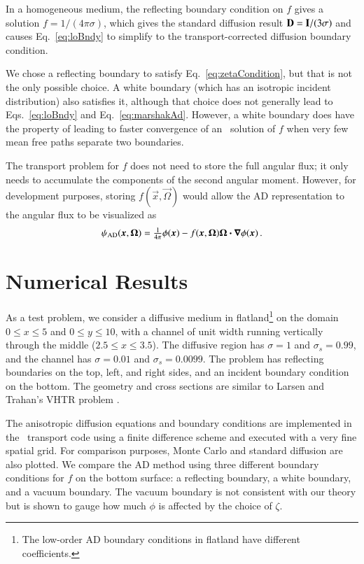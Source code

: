 \documentclass{anstrans}
\begin{document}
In a homogeneous medium, the reflecting boundary condition on $f$ gives a
solution
$f=1/(4\pi\sigma)$, which gives the standard diffusion result $\mathbf{D}=
\mathbf{I}/(3\sigma)$ and causes Eq.~\eqref{eq:loBndy} to simplify to
the transport-corrected diffusion boundary condition.

We chose a reflecting boundary to satisfy Eq.~\eqref{eq:zetaCondition}, but that
is not the only possible choice. A white boundary (which has an isotropic
incident
distribution) also satisfies it,
although that choice does not generally lead to Eqs.~\eqref{eq:loBndy} and
Eq.~\eqref{eq:marshakAd}. However, a white boundary does have the property of
leading to faster convergence of an \SN\ solution of $f$ when very few mean free
paths separate two boundaries.

The transport problem for $f$ does not need to store the full angular flux; it
only needs to accumulate the components of the second angular moment. However,
for development purposes, storing $f(\vec{x},\vec{\Omega})$ would allow the AD
representation to the angular flux to be visualized as
\begin{equation*}
  \psi_\text{AD}(\bm{x},\bm{\Omega}) = \tfrac{1}{4\pi} \phi(\bm{x})
  - f(\bm{x},\bm{\Omega}) \bm{\Omega} \bm{\cdot} \bm{\nabla} \phi(\bm{x})\,.
\end{equation*}

\section{Numerical Results}
As a test problem, we consider a diffusive medium in flatland\footnote{The
low-order AD boundary conditions in flatland have different coefficients.} on
the domain $0
\le x \le 5$ and $0 \le y \le 10$, with a channel of unit width running
vertically through the middle ($2.5 \le x \le 3.5$). The diffusive region has
$\sigma=1$ and
$\sigma_s=0.99$, and the channel has $\sigma=0.01$ and $\sigma_s=0.0099$. The
problem has
reflecting boundaries on the top, left, and right sides, and an incident
boundary condition on the bottom. The geometry and cross sections are similar
to Larsen
and Trahan's VHTR problem \cite{Lar2009c}.

The anisotropic diffusion equations and boundary conditions are implemented
in the \pytrt\ transport code \cite{Pytrt} using a finite difference scheme
and executed with a very fine spatial grid. For comparison
purposes, Monte Carlo and standard diffusion are also plotted.
We compare the AD method using three different boundary conditions for $f$ on
the bottom surface: a reflecting boundary, a white boundary, and a vacuum
boundary. The vacuum boundary is not consistent with our theory but
is shown to gauge how much $\phi$ is affected by the choice of $\zeta$.
\end{document}

